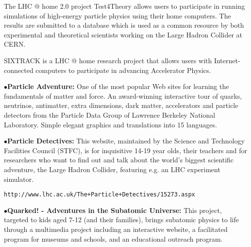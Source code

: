 \medskip

\item{}The LHC @ home 2.0 project Test4Theory allows users to participate in running simulations of high-energy particle physics using their home computers. The results are submitted to a database which is used as a common resource by both experimental and theoretical scientists working on the Large Hadron Collider at CERN.
	\item{}

\medskip

\item{}SIXTRACK is a LHC @ home research project that allows users with Internet-connected computers to participate in advancing Accelerator Physics.

	\item{}

\medskip

\item{$\bullet$}{\bf Particle Adventure:} 
One of the most popular Web sites for learning the fundamentals of matter and force. An award-winning interactive tour of quarks, neutrinos, antimatter, extra dimensions, dark matter, accelerators and particle detectors from the Particle Data Group of Lawrence Berkeley National Laboratory. Simple elegant graphics and translations into 15 languages.
	\item{}

\medskip

\item{$\bullet$}{\bf Particle Detectives:}
This website, maintained by the Science and Technology Facilities Council (STFC), is for inquisitive 14-19 year olds, their teachers and for researchers who want to find out and talk about the world's biggest scientific adventure, the Large Hadron Collider, featuring e.g. an LHC experiment simulator.
	\item{}{\tt http://www.lhc.ac.uk/The+Particle+Detectives/15273.aspx}

\medskip

\item{$\bullet$}{\bf Quarked! - Adventures in the Subatomic Universe:}
This project, targeted to kids aged 7-12 (and their families), brings subatomic physics to life through a multimedia project including an interactive website, a facilitated program for museums and schools, and an educational outreach program.
	\item{}

